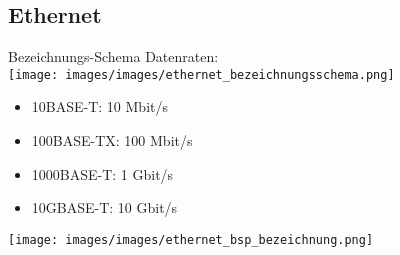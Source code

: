 \subsection*{Ethernet}

\begin{theorem}{Bezeichnungs-Schema}
    Datenraten:\\
    \texttt{[image: images/images/ethernet\_bezeichnungsschema.png]}\\
    \begin{minipage}{0.45\linewidth}
    \begin{itemize}
        \item 10BASE-T: 10 Mbit/s
        \item 100BASE-TX: 100 Mbit/s
        \item 1000BASE-T: 1 Gbit/s
        \item 10GBASE-T: 10 Gbit/s
    \end{itemize}
    \end{minipage}
    \begin{minipage}{0.45\linewidth}
        \texttt{[image: images/images/ethernet\_bsp\_bezeichnung.png]}
    \end{minipage}
\end{theorem}


